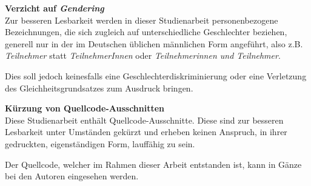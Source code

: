 \vfill
\textbf{Verzicht auf \textit{Gendering}} \\
Zur besseren Lesbarkeit werden in dieser Studienarbeit personenbezogene Bezeichnungen, die sich zugleich auf unterschiedliche Geschlechter beziehen, generell nur in der im Deutschen üblichen männlichen Form angeführt, also z.B. \textit{Teilnehmer} statt \textit{TeilnehmerInnen} oder \textit{Teilnehmerinnen und Teilnehmer}.

Dies soll jedoch keinesfalls eine Geschlechterdiskriminierung oder eine Verletzung des Gleichheitsgrundsatzes zum Ausdruck bringen.

\vspace{1cm}

\textbf{Kürzung von Quellcode-Ausschnitten} \\
Diese Studienarbeit enthält Quellcode-Ausschnitte. Diese sind zur besseren Lesbarkeit unter Umständen gekürzt und erheben keinen Anspruch, in ihrer gedruckten, eigenständigen Form, lauffähig zu sein.

Der Quellcode, welcher im Rahmen dieser Arbeit entstanden ist, kann in Gänze bei den Autoren eingesehen werden.

\vfill